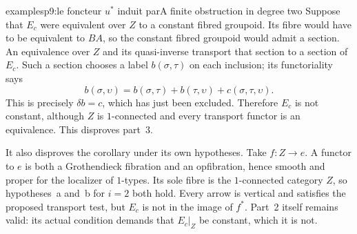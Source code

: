 \begin{dcomment}{examples}{p9:le foncteur $u^*$ induit par}{A finite obstruction in degree two}
Suppose that $E_c$ were equivalent over $Z$ to a constant fibred groupoid. Its fibre would have to be equivalent to $BA$, so the constant fibred groupoid would admit a section. An equivalence over $Z$ and its quasi-inverse transport that section to a section of $E_c$. Such a section chooses a label $b(\sigma,\tau)$ on each inclusion; its functoriality says
\[
 b(\sigma,\upsilon)
 =b(\sigma,\tau)+b(\tau,\upsilon)+c(\sigma,\tau,\upsilon).
\]
This is precisely $\delta b=c$, which has just been excluded. Therefore $E_c$ is not constant, although $Z$ is $1$-connected and every transport functor is an equivalence. This disproves part~3.

It also disproves the corollary under its own hypotheses. Take $f:Z\to e$. A functor to $e$ is both a Grothendieck fibration and an opfibration, hence smooth and proper for the localizer of $1$-types. Its sole fibre is the $1$-connected category $Z$, so hypotheses~a and~b for $i=2$ both hold. Every arrow is vertical and satisfies the proposed transport test, but $E_c$ is not in the image of $f^*$. Part~2 itself remains valid: its actual condition demands that $E_c|_Z$ be constant, which it is not.
\end{dcomment}


